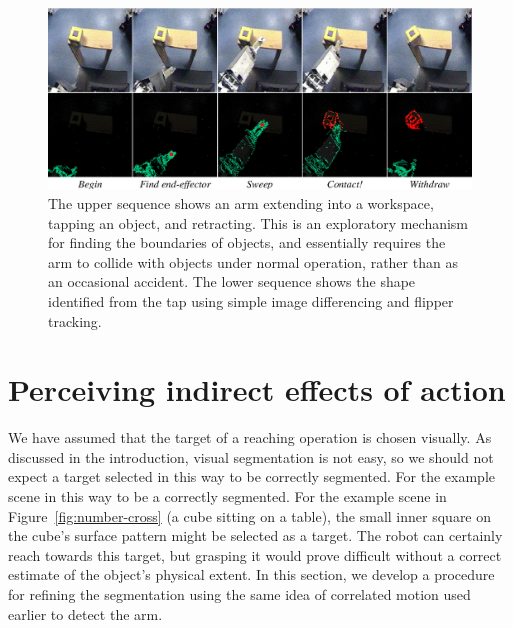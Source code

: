 
\begin{figure}[tbh]
\begin{center}
\includegraphics[width=\textwidth]{poking-sequence.eps}
\caption{ 
\label{fig:poking-sequence}
%
  The upper sequence shows an arm extending into a workspace, tapping
  an object, and retracting.  This is an exploratory mechanism for
  finding the boundaries of objects, and essentially requires the arm
  to collide with objects under normal operation, rather than as an
  occasional accident.  The lower sequence shows the shape
  identified from the tap using simple image differencing and flipper
  tracking.
%
}
\end{center}
\end{figure}


\section{Perceiving indirect effects of action}
\label{sec:poking}

We have assumed that the target of a reaching operation is chosen
visually.  As discussed in the introduction, visual
segmentation is not easy, so we should not expect a target selected in
\ifrev
this way to be correctly segmented.  For the example scene in
\else
this way to be a correctly segmented.  For the example scene in
\fi
Figure~\ref{fig:number-cross} 
(a cube sitting on a table), the small
inner square on the cube's surface pattern might be selected as a
target.  The robot can certainly reach towards this target, but
grasping it would prove difficult without a correct estimate of the
object's physical extent.  In this section, we develop a procedure
for refining the segmentation using the same idea of correlated
motion used earlier to detect the arm.

